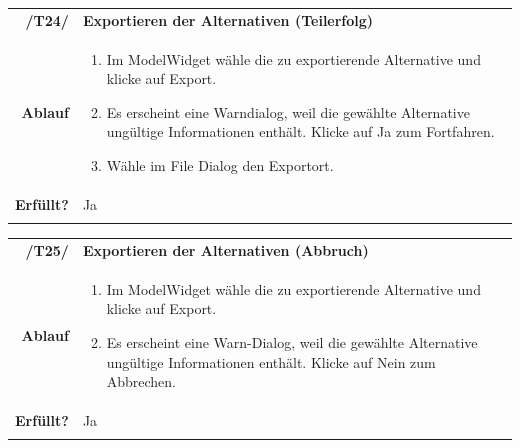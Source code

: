 \documentclass{article}
\begin{document}
\begin{table}[H]
\begin{tabularx}{\textwidth}{rX}
\vspace{1mm}
\textbf{/T24/}         & \textbf{Exportieren der Alternativen (Teilerfolg)} \\ \vspace{1mm}
\textbf{Ablauf} & 
\begin{enumerate}
        \item Im ModelWidget wähle die zu exportierende Alternative und klicke auf Export.
        \item Es erscheint eine Warndialog, weil die gewählte Alternative ungültige Informationen enthält. Klicke auf Ja zum Fortfahren.
        \item Wähle im File Dialog den Exportort.
    \end{enumerate} \\ \vspace{1mm}
\textbf{Erfüllt?}  &  Ja \\ \vspace{1mm}
\end{tabularx}
\end{table}

\begin{table}[H]
\begin{tabularx}{\textwidth}{rX}
\vspace{1mm}
\textbf{/T25/}         & \textbf{Exportieren der Alternativen (Abbruch)} \\ \vspace{1mm}
\textbf{Ablauf} & 
\begin{enumerate}
        \item Im ModelWidget wähle die zu exportierende Alternative und klicke auf Export.
        \item Es erscheint eine Warn-Dialog, weil die gewählte Alternative ungültige Informationen enthält. Klicke auf Nein zum Abbrechen.
    \end{enumerate} \\ \vspace{1mm}
\textbf{Erfüllt?}  &  Ja\\ \vspace{1mm}
\end{tabularx}
\end{table}
\end{document}
